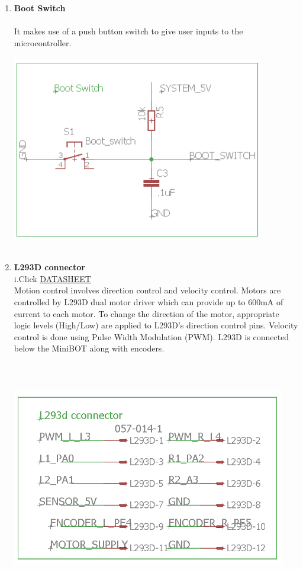 \documentclass[a4paper,12pt,oneside]{book}
\begin{document}
\begin{enumerate}
     \newpage\item \textbf{Boot Switch}\\
     \\It makes use of a push button switch to give user inputs to the microcontroller.
     \vspace*{1.5cm}
    \\\hspace*{1cm}\includegraphics[width=11cm, height=9cm]{boots}
    
     \newpage\item \textbf{L293D connector}\\
    i.Click \href{http://www.ti.com/lit/ds/symlink/l293.pdf}{DATASHEET}
    \\[0.5cm]Motion control involves direction control and velocity control. Motors are controlled by L293D dual motor driver which can provide up to 600mA of current to each motor. To change the
    direction of the motor, appropriate logic levels (High/Low) are applied to L293D’s direction control pins. Velocity control is done using Pulse Width Modulation (PWM). 
    L293D is connected below the MiniBOT along with encoders.
    \vspace*{1cm}
    \\\hspace*{0.6cm}\includegraphics[width=12cm, height=11cm]{l293d1}
    

\end{enumerate}
\end{document}
